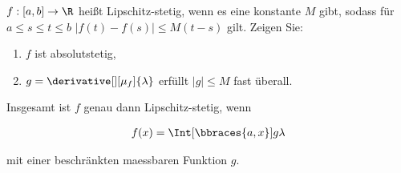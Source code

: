 
\begin{exercise}

$f: [a, b] \to \R$ heißt Lipschitz-stetig, wenn es eine konstante $M$ gibt, sodass für $a \leq s \leq t \leq b$ $|f(t) - f(s)| \leq M (t - s)$ gilt.
Zeigen Sie:

\begin{enumerate}[label = (\alph*)]
    \item $f$ ist absolutstetig,
    \item $g = \derivative[][\mu_f]{\lambda}$ erfüllt $|g| \leq M$ fast überall.
\end{enumerate}

Insgesamt ist $f$ genau dann Lipschitz-stetig, wenn

\begin{align*}
    f(x)
    =
    \Int[\bbraces{a, x}]{g}{\lambda}
\end{align*}

mit einer beschränkten maessbaren Funktion $g$.

\end{exercise}


